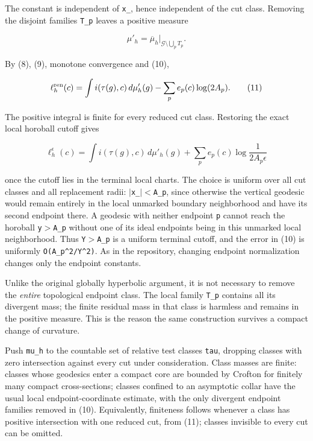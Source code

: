 \documentclass[11pt]{article}
\renewcommand{\textbar}{\ensuremath{|}}
\renewcommand{\textgreater}{\ensuremath{>}}
\renewcommand{\textless}{\ensuremath{<}}
\renewcommand{\textquotesingle}{\char39}
\begin{document}
The constant is independent of \texttt{x\_}, hence independent of the
cut class. Removing the disjoint families \texttt{T\_\allowbreak p} leaves a
positive measure

\[
\mu'_h=\overline\mu_h\big|_{\mathcal G\setminus\bigcup_p T_p}.
\]

By (8), (9), monotone convergence and (10),

\[
\ell_h^{\rm ren}(c)
=\int i(\tau(g),c)\,d\mu'_h(g)
-\sum_p e_p(c)\log(2A_p).
\tag{11}
\]

The positive integral is finite for every reduced cut class. Restoring
the exact local horoball cutoff gives

\[
\ell_h^\epsilon(c)
=\int i(\tau(g),c)\,d\mu'_h(g)
+\sum_p e_p(c)\log\frac1{2A_p\epsilon}
\tag{12}
\]

once the cutoff lies in the terminal local charts. The choice is uniform
over all cut classes and all replacement radii:
\texttt{\textbar{}x\_\textbar{}\textless{}A\_\allowbreak p}, since otherwise the
vertical geodesic would remain entirely in the local unmarked boundary
neighborhood and have its second endpoint there. A geodesic with neither
endpoint \texttt{p} cannot reach the horoball
\texttt{y\textgreater{}A\_\allowbreak p} without one of its ideal endpoints being in
this unmarked local neighborhood. Thus \texttt{Y\textgreater{}A\_\allowbreak p} is a
uniform terminal cutoff, and the error in (10) is uniformly
\texttt{O(A\_\allowbreak p\^{}2/Y\^{}2)}. As in the repository, changing endpoint
normalization changes only the endpoint constants.

Unlike the original globally hyperbolic argument, it is not necessary to
remove the \emph{entire} topological endpoint class. The local family
\texttt{T\_\allowbreak p} contains all its divergent mass; the finite residual mass
in that class is harmless and remains in the positive measure. This is
the reason the same construction survives a compact change of curvature.

Push \texttt{mu\textquotesingle{}\_\allowbreak h} to the countable set of relative
test classes \texttt{tau}, dropping classes with zero intersection
against every cut under consideration. Class masses are finite: classes
whose geodesics enter a compact core are bounded by Crofton for finitely
many compact cross-sections; classes confined to an asymptotic collar
have the usual local endpoint-coordinate estimate, with the only
divergent endpoint families removed in (10). Equivalently, finiteness
follows whenever a class has positive intersection with one reduced cut,
from (11); classes invisible to every cut can be omitted.
\end{document}

